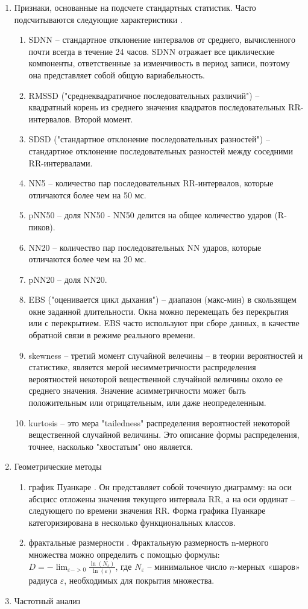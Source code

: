 \begin{enumerate}
	\item Признаки, основанные на подсчете стандартных статистик. Часто подсчитываются следующие характеристики \cite{pNN, metric_of_hrv}.
	\begin{enumerate}
		\item SDNN -- стандартное отклонение интервалов от среднего, вычисленного почти всегда в течение 24 часов. SDNN отражает все циклические компоненты, ответственные за изменчивость в период записи, поэтому она представляет собой общую вариабельность.
		\item 	RMSSD ("среднеквадратичное последовательных различий") -- квадратный корень из среднего значения квадратов последовательных RR-интервалов. Второй момент.
		\item SDSD ("стандартное отклонение последовательных разностей") -- стандартное отклонение последовательных разностей между соседними  RR-интервалами.
		\item NN5 -- количество пар последовательных RR-интервалов, которые отличаются более чем на 50 мс.
		\item pNN50 -- доля NN50 - NN50 делится на общее количество ударов (R-пиков).
		\item NN20 -- количество пар последовательных NN ударов, которые отличаются более чем на 20 мс.
		\item pNN20 -- доля NN20.
		\item EBS ("оценивается цикл дыхания") -- диапазон (макс-мин) в скользящем окне заданной длительности. Окна можно перемещать без перекрытия или с перекрытием. EBS часто используют при сборе данных, в качестве обратной связи в режиме реального времени.
		\item skewness -- третий момент случайной велечины -- в теории вероятностей и статистике, является мерой несимметричности распределения вероятностей некоторой вещественной случайной величины около ее среднего значения. Значение асимметричности может быть положительным или отрицательным, или даже неопределенным.
		\item kurtosis -- это мера "tailedness" распределения вероятностей некоторой вещественной случайной величины. Это описание формы распределения, точнее, насколько "хвостатым" оно является. 
	\end{enumerate}
	\item Геометрические методы \cite{geometric_metric}
	\begin{enumerate}
		\item график Пуанкаре \cite{poinkare_plot}. Он представляет собой точечную диаграмму: на оси абсцисс отложены значения текущего интервала RR, а на оси ординат -- следующего по времени значения RR. Форма графика Пуанкаре категоризирована в несколько функциональных классов.
		\item фрактальные размерности \cite{fractal_dim}. Фрактальную размерность n-мерного множества можно определить с помощью формулы: $D=-\lim_{\varepsilon->0}{\frac{\ln(N_\varepsilon)}{\ln(\varepsilon)}}$,
		где $N_\varepsilon$ -- минимальное число $n$-мерных «шаров» радиуса $\varepsilon$, необходимых для покрытия множества.
	\end{enumerate}	
	\item Частотный анализ
	

\end{enumerate}
